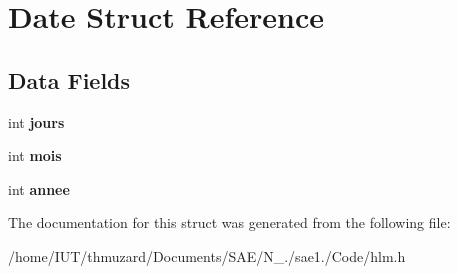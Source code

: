 \hypertarget{struct_date}{}\section{Date Struct Reference}
\label{struct_date}
\subsection*{Data Fields}
\begin{DoxyCompactItemize}
\item 
\mbox{\label{struct_date_a14cfca53638083a91dc9d133a57126d1}} 
int {\bfseries jours}
\item 
\mbox{\label{struct_date_af4d47133f30c1a134b6cecf5cedd7db9}} 
int {\bfseries mois}
\item 
\mbox{\label{struct_date_acfe2ff64f5396827db36f1575c5e99d8}} 
int {\bfseries annee}
\end{DoxyCompactItemize}


The documentation for this struct was generated from the following file\+:\begin{DoxyCompactItemize}
\item 
/home/\+I\+U\+T/thmuzard/\+Documents/\+S\+A\+E/\+N\+\_./sae1./\+Code/hlm.\+h\end{DoxyCompactItemize}
